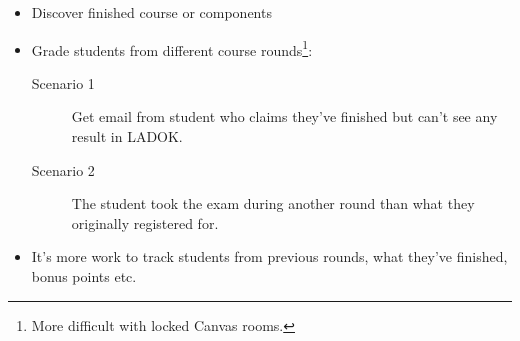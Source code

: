 \begin{frame}[fragile]\label{WishLateStudents}
  \begin{example}
    \begin{itemize}
      \item {Discover finished course or components}
      \item {Grade students from different course rounds}\footnote{%
          More difficult with locked Canvas rooms.
        }:
        \begin{description}
          \item[Scenario 1] {Get email from student who claims they've 
            finished but can't see any result in LADOK.}

          \item[Scenario 2] The student took the exam during another round than 
            what they originally registered for.
        \end{description}

      \item {It's more work to track students from previous rounds, 
        what they've finished, bonus points etc.}
    \end{itemize}
  \end{example}
\end{frame}

%
%

